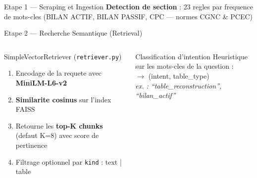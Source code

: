 \documentclass[aspectratio=169, 10pt]{beamer}
\begin{document}
\begin{frame}{Etape 1 --- Scraping et Ingestion}
  \vspace{0.2cm}
  \small\textbf{Detection de section} : 23 regles par frequence de mots-cles
  (BILAN ACTIF, BILAN PASSIF, CPC --- normes CGNC \& PCEC)
\end{frame}


\begin{frame}{Etape 2 --- Recherche Semantique (Retrieval)}
  \begin{columns}[T]
      \begin{block}{SimpleVectorRetriever (\texttt{retriever.py})}
        \begin{enumerate}\small
          \item Encodage de la requete avec \textbf{MiniLM-L6-v2}
          \item \textbf{Similarite cosinus} sur l'index FAISS
          \item Retourne les \textbf{top-K chunks} (defaut K=8)
                avec score de pertinence
          \item Filtrage optionnel par \texttt{kind} : text | table
        \end{enumerate}
      \end{block}

      \begin{alertblock}{Classification d'intention}
        Heuristique sur les mots-cles de la question :\\
        \small $\rightarrow$ (intent, table\_type)\\
        \textit{ex. : ``table\_reconstruction'', ``bilan\_actif''}
      \end{alertblock}

      \centering
  \end{columns}
\end{frame}
\end{document}
